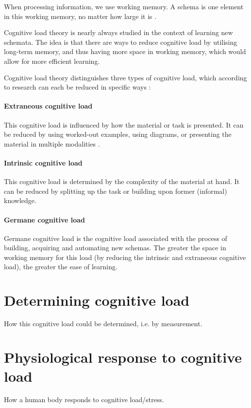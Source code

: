 \documentclass[12pt,leqno,letterpaper]{report} %
\begin{document}
When processing information, we use working memory. A schema is one element in this working memory, no matter how large it is \citep{mayer2014cambridge}. 

Cognitive load theory is nearly always studied in the context of learning new schemata. The idea is that there are ways to reduce cognitive load by utilising long-term memory, and thus having more space in working memory, which would allow for more efficient learning.

Cognitive load theory distinguishes three types of cognitive load, which according to research can each be reduced in specific ways \citep{mayer2002multimedia}:


\paragraph{Extraneous cognitive load}
This cognitive load is influenced by how the material or task is presented. It can be reduced by using worked-out examples, using diagrams, or presenting the material in multiple modalities \citep{mousavi1995reducing}.

\paragraph{Intrinsic cognitive load}
This cognitive load is determined by the complexity of the material at hand. It can be reduced by splitting up the task or building upon former (informal) knowledge.

\paragraph{Germane cognitive load}
Germane cognitive load is the cognitive load associated with the process of building, acquiring and automating new schemas. The greater the space in working memory for this load (by reducing the intrinsic and extraneous cognitive load), the greater the ease of learning.


\section{Determining cognitive load}
\citep{brunken2003direct}
How this cognitive load could be determined, i.e. by measurement.

\section{Physiological response to cognitive load}
How a human body responds to cognitive load/stress. 
\end{document}
